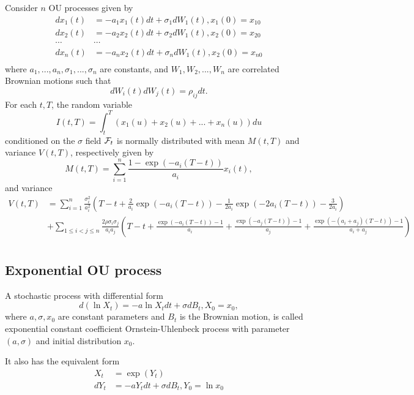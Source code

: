 \begin{refsection}
\begin{lemma}\cite[145]{brigo2007interest}\cite[64]{mcinerney2015stochastic}\label{ch:theory-of-stochastic-process:th:IntegralOfSumOfMultipleOUProcesses}
	Consider $n$ OU processes given by
	\begin{align*}
	dx_1(t) &= -a_1 x_1(t)dt + \sigma_1 dW_1(t), x_1(0) = x_{10}\\
	dx_2(t) &= -a_2 x_2(t)dt + \sigma_2 dW_1(t), x_2(0) = x_{20} \\
	\cdots & \cdots \\
	dx_n(t) &= -a_n x_2(t)dt + \sigma_n dW_1(t), x_2(0) = x_{n0} \\
	\end{align*} 
	where $a_1,...,a_n, \sigma_1,...,\sigma_n$ are constants, and $W_1, W_2,...,W_n$ are correlated Brownian motions such that
	$$dW_i(t)dW_j(t) = \rho_{ij} dt.$$	
	For each $t,T$, the random variable
	$$I(t,T) = \int_t^T (x_1(u) + x_2(u) + ... + x_n(u)) du$$
	conditioned on the $\sigma$ field $\mathcal{F}_t$ is normally distributed with mean $M(t,T)$ and variance $V(t,T)$, respectively given by
	$$M(t,T) = \sum_{i=1}^n \frac{1-\exp(-a_i(T-t))}{a_i} x_i(t),$$
	and variance 
	\begin{align*}
	V(t,T) &= \sum_{i=1}^n \frac{\sigma_i^2}{a_i^2}(T-t + \frac{2}{a_i}\exp(-a_i(T-t))-\frac{1}{2a_i}\exp(-2a_i(T-t))-\frac{3}{2a_i} ) \\
	&+ \sum_{1\leq i <j\leq n}\frac{2\rho\sigma_i\sigma_j}{a_ia_j}(T-t +\frac{\exp(-a_i(T-t))-1}{a_i}+\frac{\exp(-a_j(T-t))-1}{a_j}+\frac{\exp(-(a_i+a_j)(T-t))-1}{a_i+a_j}) \\
	\end{align*}
\end{lemma}
\subsection{Exponential  OU process}

\begin{definition}
	A stochastic process with differential form 
	$$d(\ln X_t) = -a \ln X_t dt + \sigma dB_t,X_0 = x_0,$$
	where $a, \sigma,x_0$ are constant parameters and $B_t$ is the Brownian motion,
	is called exponential constant coefficient Ornstein-Uhlenbeck process with parameter $(a,\sigma)$ and initial distribution $x_0$.
	
	It also has the equivalent form
	\begin{align*}
	X_t &= \exp(Y_t) \\
	dY_t &= -a Y_t dt + \sigma dB_t, Y_0 = \ln x_0
	\end{align*}
\end{definition}



\end{refsection}
